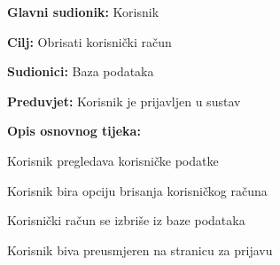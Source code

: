 					\noindent {}
					\begin{packed_item}
	
						\item \textbf{Glavni sudionik: }Korisnik
						\item  \textbf{Cilj:} Obrisati korisnički račun
						\item  \textbf{Sudionici:} Baza podataka
						\item  \textbf{Preduvjet:} Korisnik je prijavljen u sustav
						\item  \textbf{Opis osnovnog tijeka:}
						
						\item[] \begin{packed_enum}
	
							\item Korisnik pregledava korisničke podatke
							\item Korisnik bira opciju brisanja korisničkog računa
							\item Korisnički račun se izbriše iz baze podataka
							\item Korisnik biva preusmjeren na stranicu za prijavu
							
						\end{packed_enum}
							
					\end{packed_item}

